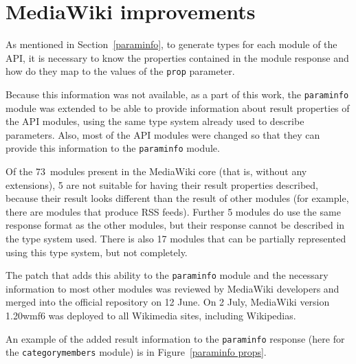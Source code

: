 \chapter{MediaWiki improvements}
\label{mw improvements}

As mentioned in Section~\ref{paraminfo}, to generate types for each module of the API,
it is necessary to know the properties contained in the module response
and how do they map to the values of the \texttt{prop} parameter.

Because this information was not available, as a part of this work,
the \texttt{paraminfo} module was extended to be able to provide information about result properties
of the API modules, using the same type system already used to describe parameters.
Also, most of the API modules were changed so that they can provide this information to the \texttt{paraminfo} module.

Of the 73~modules present in the MediaWiki core (that is, without any extensions),
5 are not suitable for having their result properties described,
because their result looks different than the result of other modules (for example, there are modules that produce RSS feeds).
Further 5 modules do use the same response format as the other modules,
but their response cannot be described in the type system used.
There is also 17 modules that can be partially represented using this type system, but not completely.

The patch that adds this ability to the \texttt{paraminfo} module and the necessary
information to most other modules was reviewed by MediaWiki developers and merged into the official repository
on 12 June.
On 2 July, MediaWiki version 1.20wmf6 was deployed to all Wikimedia sites, including Wikipedias.

An example of the added result information to the \texttt{paraminfo} response (here for the \texttt{categorymembers} module) is in Figure~\ref{paraminfo props}.

\medskip

